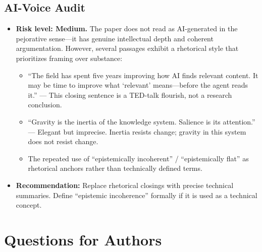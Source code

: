 \documentclass[11pt,a4paper]{article}
\begin{document}
\subsection{AI-Voice Audit}

\begin{itemize}[nosep]
\item \textbf{Risk level: Medium.} The paper does not read as AI-generated in the pejorative sense---it has genuine intellectual depth and coherent argumentation. However, several passages exhibit a rhetorical style that prioritizes framing over substance:
  \begin{itemize}[nosep]
  \item ``The field has spent five years improving how AI finds relevant content. It may be time to improve what `relevant' means---before the agent reads it.'' --- This closing sentence is a TED-talk flourish, not a research conclusion.
  \item ``Gravity is the inertia of the knowledge system. Salience is its attention.'' --- Elegant but imprecise. Inertia resists change; gravity in this system does not resist change.
  \item The repeated use of ``epistemically incoherent'' / ``epistemically flat'' as rhetorical anchors rather than technically defined terms.
  \end{itemize}
\item \textbf{Recommendation:} Replace rhetorical closings with precise technical summaries. Define ``epistemic incoherence'' formally if it is used as a technical concept.
\end{itemize}

\section{Questions for Authors}
\end{document}
